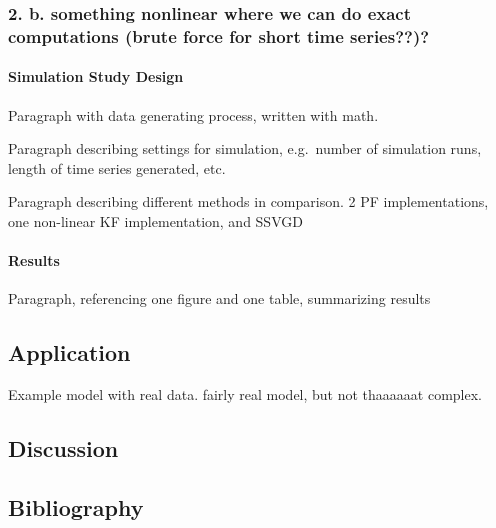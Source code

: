\documentclass[]{article}
\let\oldparagraph\paragraph
\renewcommand{\paragraph}[1]{\oldparagraph{#1}\mbox{}}
\begin{document}
\subsubsection{2. b. something nonlinear where we can do exact
computations (brute force for short time
series??)?}\label{b.-something-nonlinear-where-we-can-do-exact-computations-brute-force-for-short-time-series}

\paragraph{Simulation Study Design}\label{simulation-study-design-4}

Paragraph with data generating process, written with math.

Paragraph describing settings for simulation, e.g.~number of simulation
runs, length of time series generated, etc.

Paragraph describing different methods in comparison. 2 PF
implementations, one non-linear KF implementation, and SSVGD

\paragraph{Results}\label{results-4}

Paragraph, referencing one figure and one table, summarizing results

\subsection{Application}\label{application}

Example model with real data. fairly real model, but not thaaaaaat
complex.

\subsection{Discussion}\label{discussion}

\subsection{Bibliography}\label{bibliography}
\end{document}
